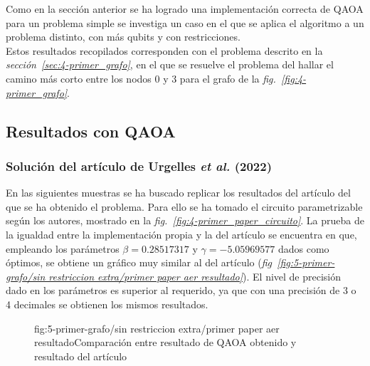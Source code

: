 Como en la sección anterior se ha logrado una implementación correcta de QAOA para un problema simple se investiga un caso en el que se aplica el algoritmo a un problema distinto, con más qubits y con restricciones.
\\
Estos resultados recopilados corresponden con el problema descrito en la \textit{sección~\ref{sec:4-primer_grafo}}, en el que se resuelve el problema del hallar el camino más corto entre los nodos 0 y 3 para el grafo de la \textit{fig.~\ref{fig:4-primer_grafo}}.

\subsection{Resultados con QAOA}

\subsubsection{Solución del artículo de Urgelles \textit{et al.} (2022)\label{sec:5-primer-paper-resultados-qiskit}}
En las siguientes muestras se ha buscado replicar los resultados del artículo\cite{multi-objective_routing_optimization} del que se ha obtenido el problema.
Para ello se ha tomado el circuito parametrizable según los autores, mostrado en la \textit{fig.~\ref{fig:4-primer_paper_circuito}}.
La prueba de la igualdad entre la implementación propia y la del artículo se encuentra en que, empleando los parámetros $\beta = 0.28517317$ y $\gamma = -5.05969577$ dados como óptimos, se obtiene un gráfico muy similar al del artículo (\textit{fig~\ref{fig:5-primer-grafo/sin restriccion extra/primer paper aer resultado}}).
El nivel de precisión dado en los parámetros es superior al requerido, ya que con una precisión de 3 o 4 decimales se obtienen los mismos resultados.

\begin{figure}[Resultados QAOA {--} artículo de Urgelles \textit{et al.} (2022) {--} comparación entre resultados]{fig:5-primer-grafo/sin restriccion extra/primer paper aer resultado}{Comparación entre resultado de QAOA obtenido y resultado del artículo\cite{multi-objective_routing_optimization}}
   \hfill
\end{figure}

